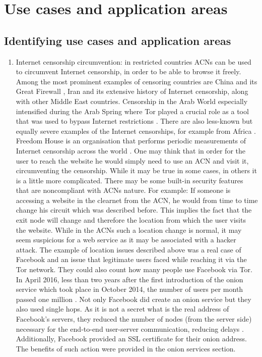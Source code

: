\chapter{Use cases and application areas}

\section{Identifying use cases and application areas}
\begin{enumerate}
    \item Internet censorship circumvention: in restricted countries ACNs can be used to circumvent Internet censorship, in order to be able to browse it freely. Among the most prominent examples of censoring countries are China and its Great Firewall \cite{gfw-china}, Iran and its extensive history of Internet censorship, along with other Middle East countries. Censorship in the Arab World especially intensified during the Arab Spring where Tor played a crucial role as a tool that was used to bypass Internet restrictions \cite{arab-spring}. There are also less-known but equally severe examples of the Internet censorships, for example from Africa \cite{africa}. Freedom House is an organisation that performs periodic measurements of Internet censorship across the world \cite{freedomhouse_internet}.
    One may think that in order for the user to reach the website he would simply need to use an ACN and visit it, circumventing the censorship. While it may be true in some cases, in others it is a little more complicated. There may be some built-in security features that are noncompliant with ACNs nature. For example: If someone is accessing a website in the clearnet from the ACN, he would from time to time change his circuit which was described before. This implies the fact that the exit node will change and therefore the location from which the user visits the website. While in the ACNs such a location change is normal, it may seem suspicious for a web service as it may be associated with a hacker attack.
    The example of location issues described above was a real case of Facebook and an issue that legitimate users faced while reaching it via the Tor network. They could also count how many people use Facebook via Tor. In April 2016, less than two years after the first introduction of the onion service which took place in October 2014, the number of users per month passed one million \cite{facebook-tor-note}. Not only Facebook did create an onion service but they also used single hops. As it is not a secret what is the real address of Facebook's servers, they reduced the number of nodes (from the server side) necessary for the end-to-end user-server communication, reducing delays \cite{facebook-tor}. Additionally, Facebook provided an SSL certificate for their onion address. The benefits of such action were provided in the onion services section.

\end{enumerate}
